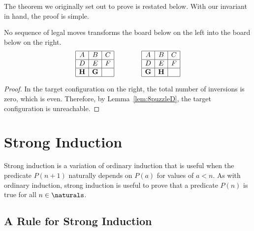 The theorem we originally set out to prove is restated below.  With our
invariant in hand, the proof is simple.
\begin{theorem*}
No sequence of legal moves transforms the board below on the left into
the board below on the right.
\begin{equation*}
\begin{array}{|c|c|c|}
\hline
A & B & C \\ \hline
D & E & F \\ \hline
\mathbf{H} & \mathbf{G} &   \\ \hline
\end{array}
\qquad\qquad
\begin{array}{|c|c|c|}
\hline
A & B & C \\ \hline
D & E & F \\ \hline
\mathbf{G} & \mathbf{H} &   \\ \hline
\end{array}
\end{equation*}
\end{theorem*}

\begin{proof}
In the target configuration on the right, the total number of
inversions is zero, which is even.  Therefore, by
Lemma~\ref{lem:8puzzleD}, the target configuration is unreachable.
\end{proof}

\section{Strong Induction}\label{sec:strong-induction}

Strong induction is a variation of ordinary induction that is useful
when the predicate $P(n+1)$ naturally depends on $P(a)$ for values of
$a < n$.  As with ordinary induction, strong induction is useful to
prove that a predicate $P(n)$ is true for all $n \in \naturals$.

\subsection{A Rule for Strong Induction}


